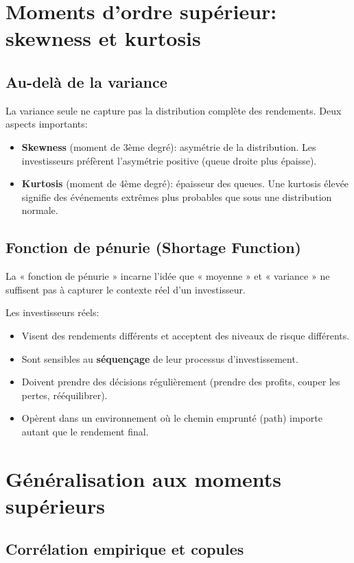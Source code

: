 \documentclass[11pt,a4paper]{article}
\begin{document}
\section{Moments d'ordre supérieur: skewness et kurtosis}

\subsection{Au-delà de la variance}

La variance seule ne capture pas la distribution complète des rendements. Deux aspects importants:

\begin{itemize}
\item \textbf{Skewness} (moment de 3ème degré): asymétrie de la distribution. Les investisseurs préfèrent l'asymétrie positive (queue droite plus épaisse).
\item \textbf{Kurtosis} (moment de 4ème degré): épaisseur des queues. Une kurtosis élevée signifie des événements extrêmes plus probables que sous une distribution normale.
\end{itemize}

\subsection{Fonction de pénurie (Shortage Function)}

La « fonction de pénurie » incarne l'idée que « moyenne » et « variance » ne suffisent pas à capturer le contexte réel d'un investisseur.

Les investisseurs réels:
\begin{itemize}
\item Visent des rendements différents et acceptent des niveaux de risque différents.
\item Sont sensibles au \textbf{séquençage} de leur processus d'investissement.
\item Doivent prendre des décisions régulièrement (prendre des profits, couper les pertes, rééquilibrer).
\item Opèrent dans un environnement où le chemin emprunté (path) importe autant que le rendement final.
\end{itemize}

\section{Généralisation aux moments supérieurs}

\subsection{Corrélation empirique et copules}
\end{document}

